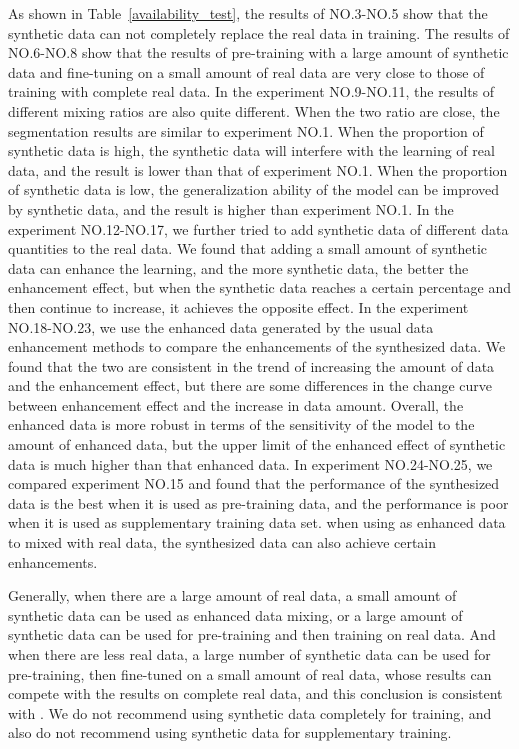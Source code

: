 \documentclass[letterpaper]{article} %
\begin{document}
As shown in Table~\ref{availability_test}, the results of NO.3-NO.5 show that the synthetic data can not completely replace the real data in training.            
The results of NO.6-NO.8 show that the results of pre-training with a large amount of synthetic data and fine-tuning on a small amount of real data are very close to those of training with complete real data.   
In the experiment NO.9-NO.11, the results of different mixing ratios are also quite different. When the two ratio are close, the segmentation results are similar to experiment NO.1. When the proportion of synthetic data is high, the synthetic data will interfere with the learning of real data, and the result is lower than that of experiment NO.1. When the proportion of synthetic data is low, the generalization ability of the model can be improved by synthetic data, and the result is higher than experiment NO.1.            
In the experiment NO.12-NO.17, we further tried to add synthetic data of different data quantities to the real data. We found that adding a small amount of synthetic data can enhance the learning, and the more synthetic data, the better the enhancement effect, but when the synthetic data reaches a certain percentage and then continue to increase, it achieves the opposite effect.  
In the experiment NO.18-NO.23, we use the enhanced data generated by the usual data enhancement methods to compare the enhancements of the synthesized data. We found that the two are consistent in the trend of increasing the amount of data and the enhancement effect, but there are some differences in  the change curve between  enhancement effect and the increase in data amount. Overall, the enhanced data is more robust in terms of the sensitivity of the model to the amount of enhanced data, but the upper limit of the enhanced effect of synthetic data is much higher than that enhanced data.   
In experiment NO.24-NO.25, we compared experiment NO.15 and found that the performance of the synthesized data is the best when it is used as pre-training data, and the performance is poor when it is used as supplementary training data set. when using as enhanced data to mixed with real data, the synthesized data can also achieve certain enhancements.

Generally, when there are a large amount of real data, a small amount of synthetic data can be used as enhanced data mixing, or a large amount of synthetic data can be used for pre-training and then training on real data. And when there are less real data, a large number of synthetic data can be used for pre-training, then fine-tuned on a small amount of real data, whose results can compete with the results on complete real data, and this conclusion is consistent with \cite{4shin2018medical}. We do not recommend using synthetic data completely for training, and also do not recommend using synthetic data for supplementary training.
\end{document}
